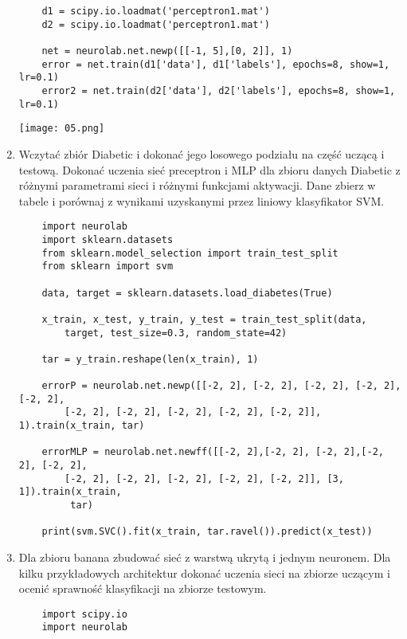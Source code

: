\documentclass[12pt,a4paper]{article}
\begin{document}
\begin{enumerate}
\begin{verbatim}
    d1 = scipy.io.loadmat('perceptron1.mat')
    d2 = scipy.io.loadmat('perceptron1.mat')
     
    net = neurolab.net.newp([[-1, 5],[0, 2]], 1)
    error = net.train(d1['data'], d1['labels'], epochs=8, show=1, lr=0.1)
    error2 = net.train(d2['data'], d2['labels'], epochs=8, show=1, lr=0.1)
                    \end{verbatim}
                            \texttt{[image: 05.png]}
     
            \item Wczytać zbiór Diabetic i dokonać jego losowego podziału na część uczącą i testową. Dokonać uczenia sieć preceptron i MLP dla zbioru danych Diabetic z różnymi parametrami sieci i różnymi funkcjami aktywacji. Dane zbierz w tabele i porównaj z wynikami uzyskanymi przez liniowy klasyfikator SVM.
     
                    \begin{verbatim}
    import neurolab
    import sklearn.datasets
    from sklearn.model_selection import train_test_split
    from sklearn import svm
     
    data, target = sklearn.datasets.load_diabetes(True)
     
    x_train, x_test, y_train, y_test = train_test_split(data,
        target, test_size=0.3, random_state=42)
     
    tar = y_train.reshape(len(x_train), 1)
     
    errorP = neurolab.net.newp([[-2, 2], [-2, 2], [-2, 2], [-2, 2], [-2, 2],
        [-2, 2], [-2, 2], [-2, 2], [-2, 2], [-2, 2]], 1).train(x_train, tar)
     
    errorMLP = neurolab.net.newff([[-2, 2],[-2, 2], [-2, 2],[-2, 2], [-2, 2],
        [-2, 2], [-2, 2], [-2, 2], [-2, 2], [-2, 2]], [3, 1]).train(x_train,
         tar)
     
    print(svm.SVC().fit(x_train, tar.ravel()).predict(x_test))
                    \end{verbatim}
            \noindent{}
     
            \item Dla zbioru banana zbudować sieć z warstwą ukrytą i jednym neuronem. Dla kilku przykładowych architektur dokonać uczenia sieci na zbiorze uczącym i ocenić sprawność klasyfikacji na zbiorze testowym.
     
                    \begin{verbatim}
    import scipy.io
    import neurolab
     

\end{verbatim}
\end{enumerate}
\end{document}
